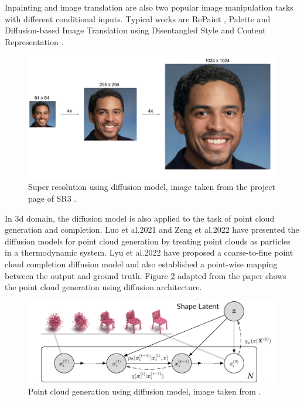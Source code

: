 \documentclass[12pt,DIV14,BCOR12mm,a4paper,footinclude=false,headinclude,parskip=half-,twoside,openright,cleardoublepage=empty,toc=index,bibliography=totoc,listof=totoc]{scrreprt}
\numberwithin{equation}{chapter}
\begin{document}
Inpainting and image translation are also two popular image manipulation tasks with different conditional inputs. Typical works are RePaint \cite{lugmayr2022repaint}, Palette \cite{saharia2022palette} and Diffusion-based Image Translation using Disentangled Style and Content Representation \cite{kwon2023diffusionbased}.
\begin{figure}[h]
	\centering
	\includegraphics[scale=.08]{img/cascade_fig.png}
	\caption{Super resolution using diffusion model, image taken from the project page of SR3 \cite{saharia2021image}.}
	\label{img:sr3}
\end{figure}


In \gls{3d} domain, the diffusion model is also applied to the task of point cloud generation and completion. Luo et al.2021 \cite{luo2021diffusion} and Zeng et al.2022 \cite{zeng2022lion} have presented the diffusion models for point cloud generation by treating point clouds as particles in a thermodynamic system. Lyu et al.2022 \cite{lyu2022conditional} have proposed a coarse-to-fine point cloud completion diffusion model and also established a point-wise mapping between the output and ground truth. Figure \ref{img:pcd} adapted from the paper shows the point cloud generation using diffusion architecture.

\begin{figure}[h]
	\centering
	\includegraphics[scale=1.8]{img/teaser.png}
	\caption{Point cloud generation using diffusion model, image taken from \cite{lyu2022conditional}.}
	\label{img:pcd}
\end{figure}
\end{document}

